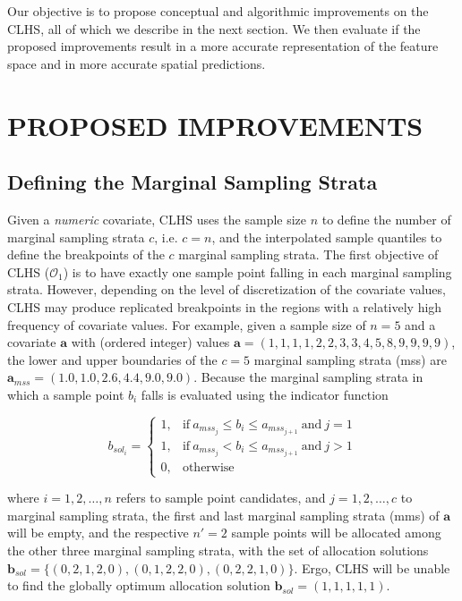 Our objective is to propose conceptual and algorithmic improvements on the CLHS, all of which we describe in 
the next section. We then evaluate if the proposed improvements result in a more accurate representation of 
the feature space and in more accurate spatial predictions.

\section{PROPOSED IMPROVEMENTS}

\subsection{Defining the Marginal Sampling Strata}

Given a \emph{numeric} covariate, CLHS uses the sample size $n$ to define the number of marginal 
sampling strata $c$, i.e. $c = n$, and the interpolated sample quantiles to define the breakpoints of the 
$c$ marginal sampling strata. The first objective of CLHS ($\mathcal{O}_1$) is to have exactly one 
sample point falling in each marginal sampling strata. However, depending on the level of discretization of 
the covariate values, CLHS may produce replicated breakpoints in the regions with a relatively high 
frequency of covariate values. For example, given a sample size of $n = 5$ and a covariate $\boldsymbol{a}$ 
with (ordered integer) values $\boldsymbol{a} = (1, 1, 1, 1, 2, 2, 3, 3, 4, 5, 8, 9, 9, 9, 9)$, the lower and 
upper boundaries of the $c = 5$ marginal sampling strata (mss) are $\boldsymbol{a}_{mss} = (1.0, 1.0, 2.6, 
4.4, 9.0, 
9.0)$. 
Because the marginal sampling strata in which a sample point $b_i$ falls is evaluated using the indicator 
function

\begin{equation*} %
 b_{sol_i} = 
 \begin{cases}
  1, & \text{if}\ a_{mss_j} \leq b_i \leq a_{mss_{j + 1}}\ \text{and}\ j = 1 \\ 
  1, & \text{if}\ a_{mss_j} < b_i \leq a_{mss_{j + 1}}\ \text{and}\ j > 1 \\ 
  0, & \text{otherwise}
 \end{cases}
\end{equation*}

\noindent where $i = 1, 2, \ldots, n$ refers to sample point candidates, and $j = 1, 2, \ldots, c$ to 
marginal sampling strata, the first and last marginal sampling strata (mms) of $\boldsymbol{a}$ will be empty, 
and the respective $n' = 2$ sample points will be allocated among the other three marginal sampling strata, 
with the set of allocation solutions $\boldsymbol{b}_{sol} = \{(0, 2, 1, 2, 0), (0, 1, 2, 2, 0), (0, 2, 2, 1, 
0)\}$. Ergo, CLHS will be unable to find the globally optimum allocation solution $\boldsymbol{b}_{sol} = (1, 
1, 1, 1, 1)$.

